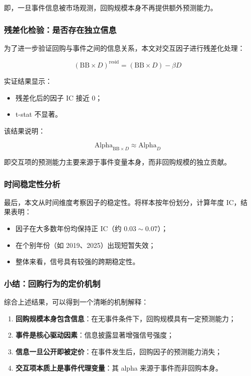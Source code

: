 \documentclass[a4paper,10pt]{article}
\begin{document}
即，一旦事件信息被市场观测，回购规模本身不再提供额外预测能力。

\subsubsection{残差化检验：是否存在独立信息}

为了进一步验证回购与事件之间的信息关系，本文对交互因子进行残差化处理：

\begin{equation}
(\text{BB} \times D)^{\text{resid}} = (\text{BB} \times D) - \beta D
\end{equation}

实证结果显示：
\begin{itemize}
    \item 残差化后的因子 IC 接近 0；
    \item t-stat 不显著。
\end{itemize}

该结果说明：

\begin{equation}
\text{Alpha}_{\text{BB} \times D} \approx \text{Alpha}_{D}
\end{equation}

即交互项的预测能力主要来源于事件变量本身，而非回购规模的独立贡献。

\subsubsection{时间稳定性分析}

最后，本文从时间维度考察因子的稳定性。将样本按年份划分，计算年度 IC，结果表明：

\begin{itemize}
    \item 因子在大多数年份均保持正 IC（约 $0.03 \sim 0.07$）；
    \item 在个别年份（如 2019、2025）出现短暂失效；
    \item 整体来看，信号具有较强的跨期稳定性。
\end{itemize}

\subsubsection{小结：回购行为的定价机制}

综合上述结果，可以得到一个清晰的机制解释：

\begin{enumerate}
    \item \textbf{回购规模本身包含信息}：在无事件条件下，回购规模具有一定预测能力；
    
    \item \textbf{事件是核心驱动因素}：信息披露显著增强信号强度；
    
    \item \textbf{信息一旦公开即被定价}：在事件发生后，回购因子的预测能力消失；
    
    \item \textbf{交互项本质上是事件代理变量}：其 alpha 来源于事件而非回购本身。
\end{enumerate}
\end{document}
